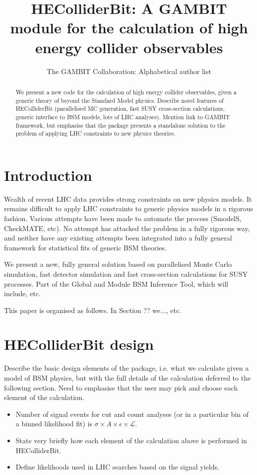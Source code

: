 \documentclass[11pt,a4paper]{article}
\title{HEColliderBit: A GAMBIT module for the calculation of high energy collider observables}
\author{The GAMBIT Collaboration: Alphabetical author list} %
\begin{document}
\maketitle

\begin{abstract}
We present a new code for the calculation of high energy collider observables, given a generic theory of beyond the Standard Model physics. Describe novel features of HEColliderBit (parallelised MC generation, fast SUSY cross-section calculations, generic interface to BSM models, lots of LHC analyses). Mention link to GAMBIT framework, but emphasise that the package presents a standalone solution to the problem of applying LHC constraints to new physics theories.
\end{abstract}

\section{Introduction}

Wealth of recent LHC data provides strong constraints on new physics models. It remains difficult to apply LHC constraints to generic physics models in a rigorous fashion. Various attempts have been made to automate the process (SmodelS, CheckMATE, etc). No attempt has attacked the problem in a fully rigorous way, and neither have any existing attempts been integrated into a fully general framework for statistical fits of generic BSM theories. 

We present a new, fully general solution based on parallelised Monte Carlo simulation, fast detector simulation and fast cross-section calculations for SUSY processes. Part of the Global and Module BSM Inference Tool, which will include, etc. 

This paper is organised as follows. In Section ?? we..., etc. 

\section{HEColliderBit design}
Describe the basic design elements of the package, i.e. what we calculate given a model of BSM physics, but with the full details of the calculation deferred to the following section. Need to emphasise that the user may pick and choose each element of the calculation.

\begin{itemize}
\item Number of signal events for cut and count analyses (or in a particular bin of a binned likelihood fit) is $\sigma \times A \times \epsilon \times \mathcal{L}$.
\item State very briefly how each element of the calculation above is performed in HEColliderBit.
\item Define likelihoods used in LHC searches based on the signal yields.
\end{itemize}
\end{document}
